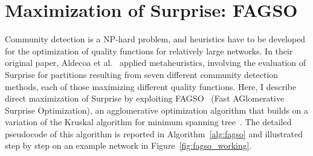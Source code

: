 \section{Maximization of Surprise: FAGSO}\label{sec:max_surprise_fagso}

Community detection is a NP-hard problem, and heuristics have to be developed for the optimization of quality functions for relatively large networks. In their original paper, Aldecoa et al.~\cite{aldecoa2011} applied metaheuristics, involving the evaluation of Surprise for partitions resulting from seven different community detection methods, each of those maximizing different quality functions.
Here, I describe direct maximization of Surprise by exploiting FAGSO~\cite{jiang2014} (Fast AGlomerative Surprise Optimization), an agglomerative optimization algorithm that builds on a variation of the Kruskal algorithm for minimum spanning tree~\cite{leiserson2001}.
The detailed pseudocode of this algorithm is reported in Algorithm~\ref{alg:fagso} and illustrated step by step on an example network in Figure~\ref{fig:fagso_working}.

